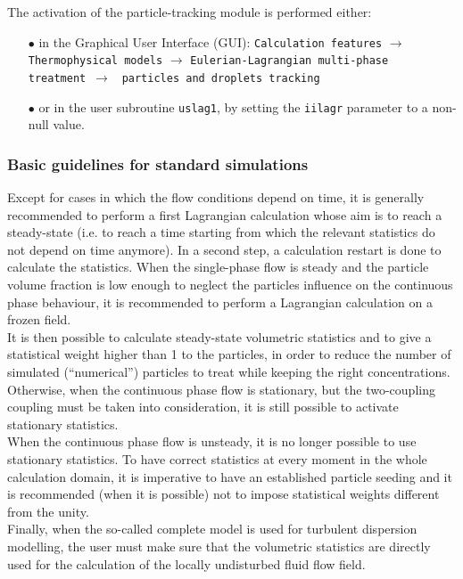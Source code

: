 {{The activation of the particle-tracking module is performed either:
%
\begin{itemize}
 \item [$\bullet$] in the Graphical User Interface (GUI): \texttt{Calculation features} $\rightarrow$ \texttt{Thermophysical models} $\rightarrow$ \texttt{Eulerian-Lagrangian multi-phase treatment}~$\rightarrow$ ~\texttt{particles and droplets tracking}
 \item [$\bullet$] or in the user subroutine \texttt{uslag1}, by setting the \texttt{iilagr} parameter to a non-null value.
\end{itemize}

\subsubsection{Basic guidelines for standard simulations}

Except for cases in which the flow conditions depend on time, it is generally recommended to perform a first Lagrangian calculation whose aim is to reach a steady-state (i.e. to reach a time starting from which the relevant statistics do not depend on time anymore). In a second step, a calculation restart is done to calculate the statistics. When the single-phase flow is steady and the particle volume fraction is low enough to neglect the particles influence on the continuous phase behaviour, it is recommended to perform a Lagrangian calculation on a frozen field.\\

It is then possible to calculate steady-state volumetric statistics and to give a statistical weight higher than 1 to the particles, in order to reduce the number of simulated (``numerical'') particles to treat while keeping the right concentrations. Otherwise, when the continuous phase flow is stationary, but the two-coupling coupling must be taken into consideration, it is still possible to activate stationary statistics. \\
When the continuous phase flow is unsteady, it is no longer possible to use stationary statistics. To have correct statistics at every moment in the whole calculation domain, it is imperative to have an established particle seeding and it is recommended (when it is possible) not to impose statistical weights different from the unity. \\

Finally, when the so-called complete model is used for turbulent dispersion modelling, the user must make sure that the volumetric statistics are directly used for the calculation of the locally undisturbed fluid flow field.\\

}}
